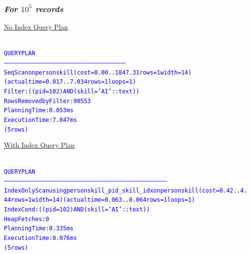 \documentclass{article}
\begin{document}
    \subsubsection*{\emph{For $10^5$ records}}
    \underline{No Index Query Plan}
    \begin{center}
      {\tiny
      \begin{alltt}
      \textcolor{blue}{
        QUERY PLAN                                                
        ---------------------------------------------------------------------------------------------------------
         Seq Scan on personskill  (cost=0.00..1847.31 rows=1 width=14) (actual time=0.017..7.034 rows=1 loops=1)
           Filter: ((pid = 102) AND (skill = 'AI'::text))
           Rows Removed by Filter: 90553
         Planning Time: 0.053 ms
         Execution Time: 7.047 ms
        (5 rows)
       }
      \end{alltt}
      }
    \end{center}
    \underline{With Index Query Plan}
    \begin{center}
      {\tiny
      \begin{alltt}
      \textcolor{blue}{
        QUERY PLAN                                                                  
        ---------------------------------------------------------------------------------------------------------------------------------------------
         Index Only Scan using personskill_pid_skill_idx on personskill  (cost=0.42..4.44 rows=1 width=14) (actual time=0.063..0.064 rows=1 loops=1)
           Index Cond: ((pid = 102) AND (skill = 'AI'::text))
           Heap Fetches: 0
         Planning Time: 0.335 ms
         Execution Time: 0.076 ms
        (5 rows)
       }
      \end{alltt}
      }
    \end{center}
\end{document}
